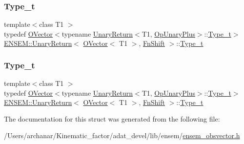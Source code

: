 \subsubsection{\texorpdfstring{Type\_t}{Type\_t}\hspace{0.1cm}{\footnotesize\ttfamily [1/2]}}
{\footnotesize\ttfamily template$<$class T1 $>$ \\
typedef \mbox{\hyperlink{classENSEM_1_1OVector}{O\+Vector}}$<$typename \mbox{\hyperlink{structENSEM_1_1UnaryReturn}{Unary\+Return}}$<$T1, \mbox{\hyperlink{structENSEM_1_1OpUnaryPlus}{Op\+Unary\+Plus}}$>$\+::\mbox{\hyperlink{structENSEM_1_1UnaryReturn_3_01OVector_3_01T1_01_4_00_01FnShift_01_4_a45f08020845d964612b7c715afabda12}{Type\+\_\+t}}$>$ \mbox{\hyperlink{structENSEM_1_1UnaryReturn}{E\+N\+S\+E\+M\+::\+Unary\+Return}}$<$ \mbox{\hyperlink{classENSEM_1_1OVector}{O\+Vector}}$<$ T1 $>$, \mbox{\hyperlink{structENSEM_1_1FnShift}{Fn\+Shift}} $>$\+::\mbox{\hyperlink{structENSEM_1_1UnaryReturn_3_01OVector_3_01T1_01_4_00_01FnShift_01_4_a45f08020845d964612b7c715afabda12}{Type\+\_\+t}}}

\mbox{\label{structENSEM_1_1UnaryReturn_3_01OVector_3_01T1_01_4_00_01FnShift_01_4_a45f08020845d964612b7c715afabda12}} 
\subsubsection{\texorpdfstring{Type\_t}{Type\_t}\hspace{0.1cm}{\footnotesize\ttfamily [2/2]}}
{\footnotesize\ttfamily template$<$class T1 $>$ \\
typedef \mbox{\hyperlink{classENSEM_1_1OVector}{O\+Vector}}$<$typename \mbox{\hyperlink{structENSEM_1_1UnaryReturn}{Unary\+Return}}$<$T1, \mbox{\hyperlink{structENSEM_1_1OpUnaryPlus}{Op\+Unary\+Plus}}$>$\+::\mbox{\hyperlink{structENSEM_1_1UnaryReturn_3_01OVector_3_01T1_01_4_00_01FnShift_01_4_a45f08020845d964612b7c715afabda12}{Type\+\_\+t}}$>$ \mbox{\hyperlink{structENSEM_1_1UnaryReturn}{E\+N\+S\+E\+M\+::\+Unary\+Return}}$<$ \mbox{\hyperlink{classENSEM_1_1OVector}{O\+Vector}}$<$ T1 $>$, \mbox{\hyperlink{structENSEM_1_1FnShift}{Fn\+Shift}} $>$\+::\mbox{\hyperlink{structENSEM_1_1UnaryReturn_3_01OVector_3_01T1_01_4_00_01FnShift_01_4_a45f08020845d964612b7c715afabda12}{Type\+\_\+t}}}



The documentation for this struct was generated from the following file\+:\begin{DoxyCompactItemize}
\item 
/\+Users/archanar/\+Kinematic\+\_\+factor/adat\+\_\+devel/lib/ensem/\mbox{\hyperlink{lib_2ensem_2ensem__obsvector_8h}{ensem\+\_\+obsvector.\+h}}\end{DoxyCompactItemize}
